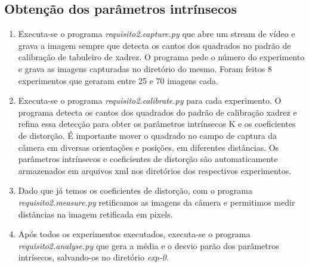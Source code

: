 \documentclass[conference]{IEEEtran}
\begin{document}
\subsection{Obtenção dos parâmetros intrínsecos}
 \begin{enumerate}
  \item Executa-se o programa \textit{requisito2.capture.py} que abre um stream de vídeo e grava a imagem sempre que detecta os cantos dos quadrados no padrão de calibração de tabuleiro de xadrez. O programa pede o número do experimento e grava as imagens capturadas no diretório do mesmo.  Foram feitos 8 experimentos que geraram entre 25 e 70 imagens cada.
  \item Executa-se o programa \textit{requisito2.calibrate.py} para cada experimento. O programa detecta os cantos dos quadrados do padrão de calibração xadrez e refina essa detecção para obter os parâmetros intrínsecos K e os coeficientes de distorção. É importante mover o quadrado no campo de captura da câmera em diversas orientações e posições, em diferentes distâncias. Os parâmetros intrínsecos e coeficientes de distorção são automaticamente armazenados em arquivos xml nos diretórios dos respectivos experimentos.
\item Dado que já temos os coeficientes de distorção, com o programa \textit{requisito2.measure.py} retificamos as imagens da câmera e permitimos medir distâncias na imagem retificada em pixels. 
\item Após todos os experimentos executados, executa-se o programa \textit{requisito2.analyse.py} que gera a média e o desvio parão dos parâmetros intrísecos, salvando-os no diretório \textit{exp-0}.
\end{enumerate}
\end{document}

